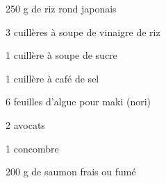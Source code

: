 


\totaltime{}


\begin{ingredients}
    \item 250 g de riz rond japonais
    \item 3 cuillères à soupe de vinaigre de riz
    \item 1 cuillère à soupe de sucre
    \item 1 cuillère à café de sel
    \item 6 feuilles d’algue pour maki (nori)
    \item 2 avocats
    \item 1 concombre
    \item 200 g de saumon frais ou fumé
\end{ingredients}

